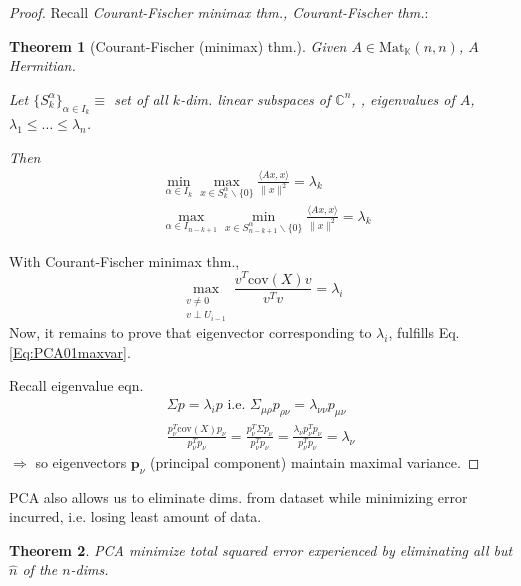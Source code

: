 \documentclass[10pt]{amsart}
\newtheorem{theorem}{Theorem}
\begin{document}
\begin{multicols*}{2}
\begin{proof}
Recall \emph{Courant-Fischer minimax thm., Courant-Fischer thm.}: 

\begin{theorem}[Courant-Fischer (minimax) thm.]
Given $A\in \text{Mat}_{\mathbb{K}}(n,n)$, $A$ Hermitian.  

Let $\lbrace S_k^{\alpha} \rbrace_{\alpha \in I_k} \equiv $ set of all $k$-dim. linear subspaces of $\mathbb{C}^n$, , eigenvalues of $A$, $\lambda_1 \leq \dots \leq \lambda_n$.  

Then 
\begin{equation}
\begin{aligned}
	& \min_{\alpha \in I_k} \max_{ x\in S_k^{\alpha} \backslash \lbrace 0 \rbrace } \frac{ \langle Ax,x \rangle }{  \| x\|^2  } = \lambda_k \\ 	
	& \max_{\alpha \in I_{n-k+1} } \min_{x  \in S^{\alpha}_{n-k+1}  \backslash \lbrace 0 \rbrace  } \frac{ \langle Ax,x \rangle }{ \| x \|^2 } = \lambda_k
\end{aligned}
\end{equation}
\end{theorem} 

With Courant-Fischer minimax thm., 
\begin{equation}\label{Eq:PCA01maxvar}
\max_{ \substack{ v\neq 0 \\ v\perp U_{i-1} } } \frac{ v^T \text{cov}(X) v}{ v^T v} = \lambda_i 
\end{equation}
Now, it remains to prove that eigenvector corresponding to $\lambda_i$, fulfills Eq. \ref{Eq:PCA01maxvar}.  

Recall eigenvalue eqn. 
\[
\begin{gathered}
	\Sigma p = \lambda_i p \text{ i.e. } \Sigma_{\mu \rho } p_{\rho \nu} = \lambda_{ \nu \nu} p_{\mu \nu } \\ 
 \frac{ p_{\nu}^T \text{cov}(X) p_{\nu } }{ p_{\nu}^T p_{\nu} } = \frac{ p_{\nu}^T \Sigma p_{\nu} }{ p_{\nu}^T p_{\nu} } = \frac{ \lambda_{\nu}  p_{\nu}^T p_{\nu} }{ p_{\nu}^T p_{\nu} } = \lambda_{\nu}
\end{gathered}
\]
$\Longrightarrow$ so eigenvectors $\mathbf{p}_{\nu}$ (principal component) maintain maximal variance.  


\end{proof}

PCA also allows us to eliminate dims. from dataset while minimizing error incurred, i.e. losing least amount of data.  

\begin{theorem}\label{Thm:PCAminerr}
PCA minimize total squared error experienced by eliminating all but $\widehat{n}$ of the $n$-dims.  
\end{theorem}


\end{multicols*}
\end{document}
